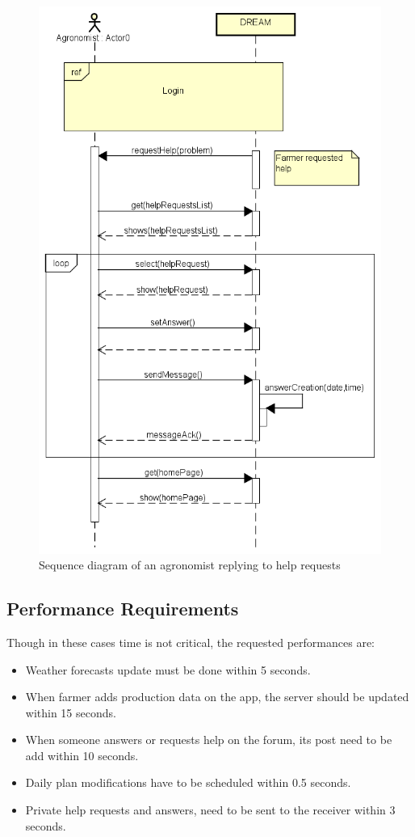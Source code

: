 \bigskip
\begin{figure}[H]
    \centering
    \includegraphics[scale=0.7]{Images/agronomistAnswersHelpRequests.png}
    \caption{Sequence diagram of an agronomist replying to help requests}
\end{figure}

\newpage
\subsection{Performance Requirements}
Though in these cases time is not critical, the requested performances are:
\begin{itemize}
    \item Weather forecasts update must be done within 5 seconds.
    \item When farmer adds production data on the app, the server should be updated within 15 seconds.
    \item When someone answers or requests help on the forum, its post need to be add within 10 seconds.
    \item Daily plan modifications have to be scheduled within 0.5 seconds.
    \item Private help requests and answers, need to be sent to the receiver within 3 seconds.
\end{itemize}


